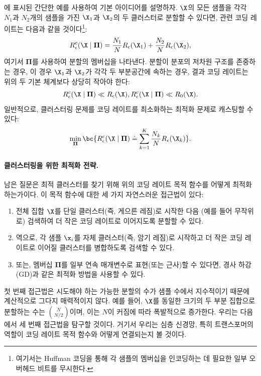 \documentclass[../../book-main_ko.tex]{subfiles}
\begin{document}
에 표시된 간단한 예를 사용하여 기본 아이디어를 설명하자. $\X$의 모든 샘플을 각각 $N_1$과 $N_2$개의 샘플을 가진 $\X_1$과 $\X_2$의 두 클러스터로 분할할 수 있다면, 관련 코딩 레이트는 다음과 같을 것이다\footnote{여기서는 Huffman 코딩을 통해 각 샘플의 멤버십을 인코딩하는 데 필요한 일부 오버헤드 비트를 무시한다.}:
\begin{equation}
	R_{\epsilon}^c(\X\mid \boldsymbol{\Pi}) = \frac{N_1}{N}R_{\epsilon}(\X_1) + \frac{N_2}{N}R_{\epsilon}(\X_2),
\end{equation}
여기서 $\boldsymbol{\Pi}$를 사용하여 분할의 멤버십을 나타낸다. 분할이 분포의 저차원 구조를 존중하는 경우, 이 경우 $\X_1$과 $\X_2$가 각각 두 부분공간에 속하는 경우, 결과 코딩 레이트는 위의 두 기본 체계보다 상당히 작아야 한다:
\begin{equation}
	R_{\epsilon}^c(\X \mid \boldsymbol{\Pi}) \ll R_{\epsilon}(\X),          R_{\epsilon}^c(\X \mid \boldsymbol{\Pi}) \ll R_0(\X).
\end{equation}
일반적으로, 클러스터링 문제를 코딩 레이트를 최소화하는 최적화 문제로 캐스팅할 수 있다:
\begin{equation}
	\min_{\boldsymbol{\Pi}}  \bc{ R_{\epsilon}^c(\X \mid \boldsymbol{\Pi})
	\doteq \sum_{k=1}^K \frac{N_k}{N}R_{\epsilon}(\X_k)}.
\end{equation}

\paragraph{클러스터링을 위한 최적화 전략.}
남은 질문은 최적 클러스터를 찾기 위해 위의 코딩 레이트 목적 함수를 어떻게 최적화하는가이다. 이 목적 함수에 대한 세 가지 자연스러운 접근법이 있다:
\begin{enumerate}
	\item 전체 집합 $\X$를 단일 클러스터(즉, 게으른 레짐)로 시작한 다음 (예를 들어 무작위로) 검색하여 더 작은 코딩 레이트로 이어지도록 분할할 수 있다.
	\item 역으로, 각 샘플 $\x_i$를 자체 클러스터(즉, 암기 레짐)로 시작하고 더 작은 코딩 레이트로 이어질 클러스터를 병합하도록 검색할 수 있다.
	\item 또는, 멤버십 $\boldsymbol{\Pi}$를 일부 연속 매개변수로 표현(또는 근사)할 수 있다면, 경사 하강(GD)과 같은 최적화 방법을 사용할 수 있다.
\end{enumerate}
첫 번째 접근법은 시도해야 하는 가능한 분할의 수가 샘플 수에서 지수적이기 때문에 계산적으로 그다지 매력적이지 않다. 예를 들어, $\X$를 동일한 크기의 두 부분 집합으로 분할하는 수는 $N \choose N/2$이며, 이는 $N$이 커짐에 따라 폭발적으로 증가한다. 우리는 다음 에서 세 번째 접근법을 탐구할 것이다. 거기서 우리는 심층 신경망, 특히 트랜스포머의 역할이 코딩 레이트 목적 함수와 어떻게 연결되는지 볼 것이다.
\end{document}
